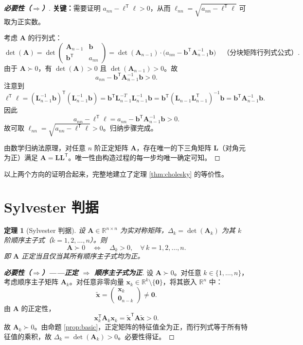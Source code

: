 \documentclass[12pt,a4paper]{article}
\theoremstyle{mystyle}
\newtheorem{theorem}{定理}[section]
\theoremstyle{proofstyle}
\newtheorem*{proof}{证明}
\theoremstyle{definition}
\theoremstyle{remark}
\newcommand{\R}{\mathbb{R}}
\newcommand{\T}{^{\mathsf{T}}}
\newcommand{\x}{\mathbf{x}}
\newcommand{\A}{\mathbf{A}}
\newcommand{\Lmat}{\mathbf{L}}
\newcommand{\zero}{\mathbf{0}}
\begin{document}
\begin{proof}[\textbf{必要性（$\Longrightarrow$）}]
\textbf{关键：}需要证明 $a_{nn} - \boldsymbol{\ell}\T\boldsymbol{\ell} > 0$，从而 $\ell_{nn} = \sqrt{a_{nn} - \boldsymbol{\ell}\T\boldsymbol{\ell}}$ 可取为正实数。

考虑 $\A$ 的行列式：
\[
    \det(\A) = \det\begin{pmatrix}
        \A_{n-1} & \mathbf{b} \\
        \mathbf{b}\T & a_{nn}
    \end{pmatrix}
    = \det(\A_{n-1}) \cdot \big(a_{nn} - \mathbf{b}\T\A_{n-1}^{-1}\mathbf{b}\big) \quad\text{（分块矩阵行列式公式）}.
\]
由于 $\A \succ 0$，有 $\det(\A) > 0$ 且 $\det(\A_{n-1}) > 0$。故
\[
    a_{nn} - \mathbf{b}\T\A_{n-1}^{-1}\mathbf{b} > 0.
\]
注意到
\[
    \boldsymbol{\ell}\T\boldsymbol{\ell} = (\Lmat_{n-1}^{-1}\mathbf{b})\T(\Lmat_{n-1}^{-1}\mathbf{b})
    = \mathbf{b}\T\Lmat_{n-1}^{-T}\Lmat_{n-1}^{-1}\mathbf{b}
    = \mathbf{b}\T(\Lmat_{n-1}\Lmat_{n-1}\T)^{-1}\mathbf{b}
    = \mathbf{b}\T\A_{n-1}^{-1}\mathbf{b}.
\]
因此
\[
    a_{nn} - \boldsymbol{\ell}\T\boldsymbol{\ell} = a_{nn} - \mathbf{b}\T\A_{n-1}^{-1}\mathbf{b} > 0.
\]
故可取 $\ell_{nn} = \sqrt{a_{nn} - \boldsymbol{\ell}\T\boldsymbol{\ell}} > 0$。归纳步骤完成。

由数学归纳法原理，对任意 $n$ 阶正定矩阵 $\A$，存在唯一的下三角矩阵 $\Lmat$（对角元为正）满足 $\A = \Lmat\Lmat\T$。唯一性由构造过程的每一步均唯一确定可知。
\end{proof}

以上两个方向的证明合起来，完整地建立了定理 \ref{thm:cholesky} 的等价性。

\section{Sylvester 判据}

\begin{theorem}[Sylvester 判据]\label{thm:sylvester}
设 $\A \in \R^{n\times n}$ 为实对称矩阵，$\Delta_k = \det(\A_k)$ 为其 $k$ 阶顺序主子式（$k = 1,2,\dots,n$）。则
\[
    \A \succ 0 \quad \Longleftrightarrow \quad \Delta_k > 0,\quad \forall\, k = 1,2,\dots,n.
\]
即 $\A$ 正定当且仅当其所有顺序主子式均为正。
\end{theorem}

\begin{proof}[\textbf{必要性（$\Longrightarrow$）——正定 $\Rightarrow$ 顺序主子式为正}]

设 $\A \succ 0$。对任意 $k \in \{1,\dots,n\}$，考虑顺序主子矩阵 $\A_k$。对任意非零向量 $\x_k \in \R^k \setminus \{\zero\}$，将其嵌入 $\R^n$ 中：
\[
    \tilde{\x} = \begin{pmatrix} \x_k \\ \mathbf{0}_{n-k} \end{pmatrix} \neq \zero.
\]
由 $\A$ 的正定性，
\[
    \x_k\T\A_k\x_k = \tilde{\x}\T\A\tilde{\x} > 0.
\]
故 $\A_k \succ 0$。由命题 \ref{prop:basic}，正定矩阵的特征值全为正，而行列式等于所有特征值的乘积，故 $\Delta_k = \det(\A_k) > 0$。必要性得证。
\end{proof}
\end{document}
